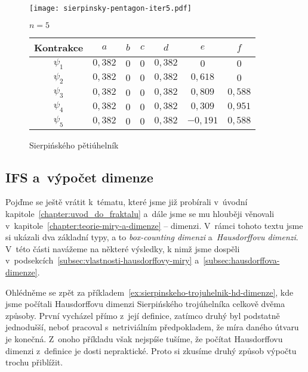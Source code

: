 \begin{figure}[H]
    \centering
    \texttt{[image: sierpinsky-pentagon-iter5.pdf]}
    \begin{center}
        $n=5$
    \end{center}
    \begin{tabular}{c|cccccc}
    Kontrakce   & $a$   & $b$   & $c$   & $d$   & $e$   & $f$                   \\\hline
    $\psi_1$    & $0{,}382$ & $0$ & $0$ & $0{,}382$ & $0$   & $0$               \\
    $\psi_2$    & $0{,}382$ & $0$ & $0$ & $0{,}382$ & $0{,}618$   & $0$         \\
    $\psi_3$    & $0{,}382$ & $0$ & $0$ & $0{,}382$ & $0{,}809$   & $0{,}588$   \\
    $\psi_4$    & $0{,}382$ & $0$ & $0$ & $0{,}382$ & $0{,}309$   & $0{,}951$   \\
    $\psi_5$    & $0{,}382$ & $0$ & $0$ & $0{,}382$ & $-0{,}191$   & $0{,}588$  \\
    \end{tabular}
    \caption{Sierpińského pětiúhelník}
    \label{fig:sierpinskeho-petiuhelnik}
\end{figure}

\subsection{IFS a~výpočet dimenze}\label{subsec:ifs-vypocet-dimenze}

Pojďme se ještě vrátit k~tématu, které jsme již probírali v~úvodní kapitole~\ref{chapter:uvod_do_fraktalu} a~dále jsme se mu hlouběji věnovali v~kapitole~\ref{chapter:teorie-miry-a-dimenze} -- dimenzi. V~rámci tohoto textu jsme si ukázali dva základní typy, a to \emph{box-counting dimenzi} a~\emph{Hausdorffovu dimenzi}. V~této části navážeme na některé výsledky, k nimž jsme dospěli v~podsekcích~\ref{subsec:vlastnosti-hausdorffovy-miry} a~\ref{subsec:hausdorffova-dimenze}.

Ohlédněme se zpět za příkladem~\ref{ex:sierpinskeho-trojuhelnik-hd-dimenze}, kde jsme počítali Hausdorffovu dimenzi Sierpińského trojúhelníka celkově dvěma způsoby. První vycházel přímo z~její definice, zatímco druhý byl podstatně jednodušší, neboť pracoval s~netriviálním předpokladem, že míra daného útvaru je konečná. Z~onoho příkladu však nejspíše tušíme, že počítat Hausdorffovu dimenzi z~definice je dosti nepraktické. Proto si zkusíme druhý způsob výpočtu trochu přiblížit.

